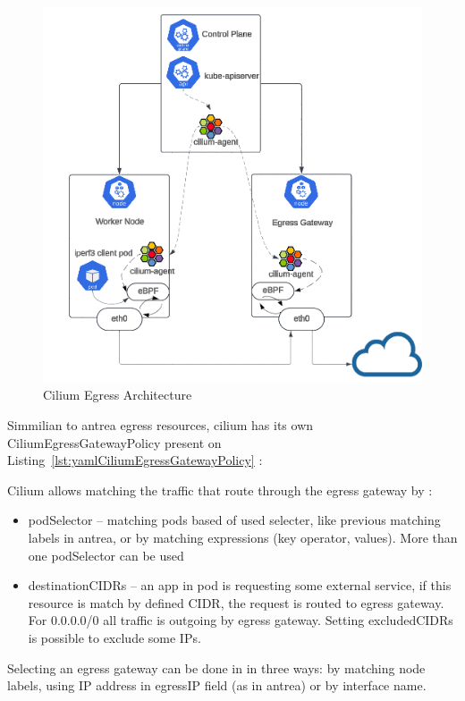 \begin{figure}[tbh]
    \centering
    \includegraphics[width=0.9\columnwidth]{images/cilium_egress.png}
    \caption{Cilium Egress Architecture \cite{CiliumEgressGatewayBlog}}
    \label{fig:ciliumEgressArch}
\end{figure}

Simmilian to antrea egress resources, cilium has its own CiliumEgressGatewayPolicy present on Listing~\ref{lst:yamlCiliumEgressGatewayPolicy} \cite{CiliumEgressGateway}:

Cilium allows matching the traffic that route through the egress gateway by \cite{CiliumEgressGateway}:
\begin{itemize}
    \item podSelector -- matching pods based of used selecter, like previous matching labels in antrea, or by matching expressions (key operator, values). More than one podSelector can be used
    \item destinationCIDRs -- an app in pod is requesting some external service, if this resource is match by defined CIDR, the request is routed to egress gateway. For 0.0.0.0/0 all traffic is outgoing by egress gateway. Setting excludedCIDRs is possible to exclude some IPs.
\end{itemize}

Selecting an egress gateway can be done in in three ways: by matching node labels, using IP address in egressIP field (as in antrea) or by interface name. 

